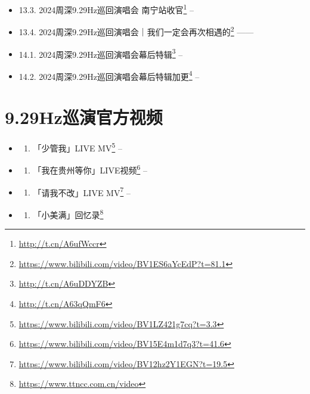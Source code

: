 \documentclass[]{ctexbook}
\providecommand{\tightlist}{%
  \setlength{\itemsep}{0pt}\setlength{\parskip}{0pt}}
\renewcommand{\href}[2]{#2\footnote{\url{#1}}}
\begin{document}
\begin{itemize}
\item
  13.3. \href{http://t.cn/A6ufWccr}{2024周深9.29Hz巡回演唱会 南宁站收官} -- \citet{weibo-charlie-studio}\\
\item
  13.4. \href{https://www.bilibili.com/video/BV1ES6aYcEdP?t=81.1}{2024周深9.29Hz巡回演唱会｜我们一定会再次相遇的} ------ \citet{bili-charlie-studio}
\item
  14.1. \href{http://t.cn/A6uDDYZB}{2024周深9.29Hz巡回演唱会幕后特辑} -- \citet{weibo-sina-music1}\\
\item
  14.2. \href{http://t.cn/A63qQmF6}{2024周深9.29Hz巡回演唱会幕后特辑加更} -- \citet{weibo-sina-music2}
\end{itemize}

\section{9.29Hz巡演官方视频}\label{official-video}

\begin{itemize}
\tightlist
\item
  \begin{enumerate}
  \def\labelenumi{\arabic{enumi}.}
  \tightlist
  \item
    \href{https://www.bilibili.com/video/BV1LZ421g7cq?t=3.3}{「少管我」LIVE MV} --\citet{bili-charlie-studio}
  \end{enumerate}
\item
  \begin{enumerate}
  \def\labelenumi{\arabic{enumi}.}
  \setcounter{enumi}{1}
  \tightlist
  \item
    \href{https://www.bilibili.com/video/BV15E4m1d7q3?t=41.6}{「我在贵州等你」LIVE视频} --\citet{bili-charlie-studio}
  \end{enumerate}
\item
  \begin{enumerate}
  \def\labelenumi{\arabic{enumi}.}
  \setcounter{enumi}{2}
  \tightlist
  \item
    \href{https://www.bilibili.com/video/BV12hz2Y1EGN?t=19.5}{「请我不改」LIVE MV} --\citet{bili-charlie-studio}
  \end{enumerate}
\item
  \begin{enumerate}
  \def\labelenumi{\arabic{enumi}.}
  \setcounter{enumi}{3}
  \tightlist
  \item
    \href{https://www.ttncc.com.cn/video}{「小美满」回忆录}
  \end{enumerate}
\end{itemize}
\end{document}
